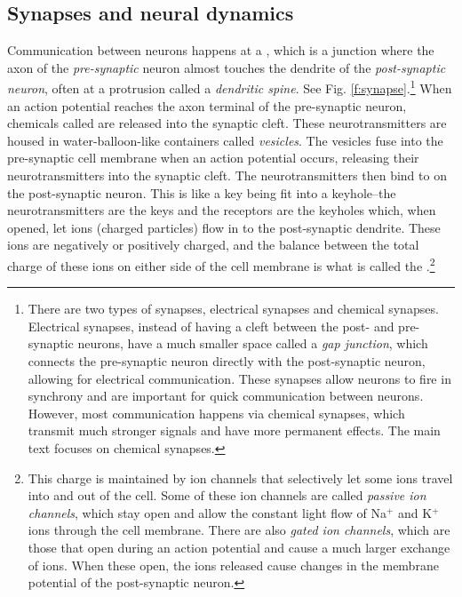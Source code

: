 \subsection{Synapses and neural dynamics}\label{simpleNeuralDynamics}

Communication between neurons happens at a , which is a junction where the axon of the \emph{pre-synaptic} neuron almost touches the dendrite of the \emph{post-synaptic neuron}, often at a protrusion called a \emph{dendritic spine}. See Fig. \ref{f:synapse}.\footnote{There are two types of synapses, electrical synapses and chemical synapses. Electrical synapses, instead of having a cleft between the post- and pre-synaptic neurons, have a much smaller space called a \emph{gap junction}, which connects the pre-synaptic neuron directly with the post-synaptic neuron, allowing for electrical communication. These synapses allow neurons to fire in synchrony and are important for quick communication between neurons. However, most communication happens via chemical synapses, which transmit much stronger signals and have more permanent effects. The main text focuses on chemical synapses.}  When an action potential reaches the axon terminal of the pre-synaptic neuron, chemicals called  are released into the synaptic cleft. These neurotransmitters are housed in water-balloon-like containers called \emph{vesicles}. The vesicles fuse into the pre-synaptic cell membrane when an action potential occurs, releasing their neurotransmitters into the synaptic cleft. The neurotransmitters then bind to  on the post-synaptic neuron. This is like a key being fit into a keyhole--the neurotransmitters are the keys and the receptors are the keyholes which, when opened, let ions (charged particles) flow in to the post-synaptic dendrite. These ions are negatively or positively charged, and the balance between the total charge of these ions on either side of the cell membrane is what is called the .\footnote{This charge is maintained by ion channels that selectively let some ions travel into and out of the cell. Some of these ion channels are called \emph{passive ion channels}, which stay open and allow the constant light flow of Na$^+$ and K$^+$ ions through the cell membrane. There are also \emph{gated ion channels}, which are those that open during an action potential and cause a much larger exchange of ions. When these open, the ions released cause changes in the membrane potential of the post-synaptic neuron.}
